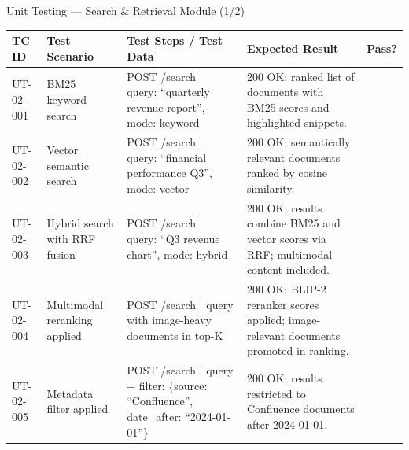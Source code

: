 \documentclass[aspectratio=169,xcolor=dvipsnames]{beamer}
\newcommand{\cmark}{\checkmark}
\newcommand{\tw}{\textwidth}
\begin{document}
\begin{frame}{Unit Testing — Search \& Retrieval Module (1/2)}
  \tiny\renewcommand{\arraystretch}{0.88}
  \begin{table}
    \centering
    \setlength{\tabcolsep}{2pt}
    \begin{tabular}{p{.09\tw}|p{.15\tw}|p{.44\tw}|p{.18\tw}|p{.07\tw}}
      \toprule
      \textbf{TC ID} & \textbf{Test Scenario} & \textbf{Test Steps / Test Data} & \textbf{Expected Result} & \textbf{Pass?}\\
      \midrule
      UT-02-001 & BM25 keyword search &
        POST /search | query: ``quarterly revenue report'', mode: keyword &
        200 OK; ranked list of documents with BM25 scores and highlighted snippets. & \textcolor{green!60!black}{\cmark}\\
      \midrule
      UT-02-002 & Vector semantic search &
        POST /search | query: ``financial performance Q3'', mode: vector &
        200 OK; semantically relevant documents ranked by cosine similarity. & \textcolor{green!60!black}{\cmark}\\
      \midrule
      UT-02-003 & Hybrid search with RRF fusion &
        POST /search | query: ``Q3 revenue chart'', mode: hybrid &
        200 OK; results combine BM25 and vector scores via RRF; multimodal content included. & \textcolor{green!60!black}{\cmark}\\
      \midrule
      UT-02-004 & Multimodal reranking applied &
        POST /search | query with image-heavy documents in top-K &
        200 OK; BLIP-2 reranker scores applied; image-relevant documents promoted in ranking. & \textcolor{green!60!black}{\cmark}\\
      \midrule
      UT-02-005 & Metadata filter applied &
        POST /search | query + filter: \{source: ``Confluence'', date\_after: ``2024-01-01''\} &
        200 OK; results restricted to Confluence documents after 2024-01-01. & \textcolor{green!60!black}{\cmark}\\
      \bottomrule
    \end{tabular}
  \end{table}
\end{frame}
\end{document}
